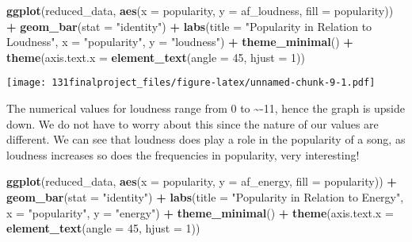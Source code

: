 \documentclass[
]{article}
\newenvironment{Shaded}{\begin{snugshade}}{\end{snugshade}}
\newcommand{\AttributeTok}[1]{\textcolor[rgb]{0.13,0.29,0.53}{#1}}
\newcommand{\DecValTok}[1]{\textcolor[rgb]{0.00,0.00,0.81}{#1}}
\newcommand{\FunctionTok}[1]{\textcolor[rgb]{0.13,0.29,0.53}{\textbf{#1}}}
\newcommand{\NormalTok}[1]{#1}
\newcommand{\SpecialCharTok}[1]{\textcolor[rgb]{0.81,0.36,0.00}{\textbf{#1}}}
\newcommand{\StringTok}[1]{\textcolor[rgb]{0.31,0.60,0.02}{#1}}
\begin{document}
\begin{Shaded}
\begin{Highlighting}[]
\FunctionTok{ggplot}\NormalTok{(reduced\_data, }\FunctionTok{aes}\NormalTok{(}\AttributeTok{x =}\NormalTok{ popularity, }\AttributeTok{y =}\NormalTok{ af\_loudness, }\AttributeTok{fill =}\NormalTok{ popularity)) }\SpecialCharTok{+}
  \FunctionTok{geom\_bar}\NormalTok{(}\AttributeTok{stat =} \StringTok{"identity"}\NormalTok{) }\SpecialCharTok{+}
  \FunctionTok{labs}\NormalTok{(}\AttributeTok{title =} \StringTok{"Popularity in Relation to Loudness"}\NormalTok{, }\AttributeTok{x =} \StringTok{"popularity"}\NormalTok{, }\AttributeTok{y =} \StringTok{"loudness"}\NormalTok{) }\SpecialCharTok{+}
  \FunctionTok{theme\_minimal}\NormalTok{() }\SpecialCharTok{+}
  \FunctionTok{theme}\NormalTok{(}\AttributeTok{axis.text.x =} \FunctionTok{element\_text}\NormalTok{(}\AttributeTok{angle =} \DecValTok{45}\NormalTok{, }\AttributeTok{hjust =} \DecValTok{1}\NormalTok{))}
\end{Highlighting}
\end{Shaded}

\texttt{[image: 131finalproject\_files/figure-latex/unnamed-chunk-9-1.pdf]}

The numerical values for loudness range from 0 to \textasciitilde-11,
hence the graph is upside down. We do not have to worry about this since
the nature of our values are different. We can see that loudness does
play a role in the popularity of a song, as loudness increases so does
the frequencies in popularity, very interesting!

\begin{Shaded}
\begin{Highlighting}[]
\FunctionTok{ggplot}\NormalTok{(reduced\_data, }\FunctionTok{aes}\NormalTok{(}\AttributeTok{x =}\NormalTok{ popularity, }\AttributeTok{y =}\NormalTok{ af\_energy, }\AttributeTok{fill =}\NormalTok{ popularity)) }\SpecialCharTok{+}
  \FunctionTok{geom\_bar}\NormalTok{(}\AttributeTok{stat =} \StringTok{"identity"}\NormalTok{) }\SpecialCharTok{+}
  \FunctionTok{labs}\NormalTok{(}\AttributeTok{title =} \StringTok{"Popularity in Relation to Energy"}\NormalTok{, }\AttributeTok{x =} \StringTok{"popularity"}\NormalTok{, }\AttributeTok{y =} \StringTok{"energy"}\NormalTok{) }\SpecialCharTok{+}
  \FunctionTok{theme\_minimal}\NormalTok{() }\SpecialCharTok{+}
  \FunctionTok{theme}\NormalTok{(}\AttributeTok{axis.text.x =} \FunctionTok{element\_text}\NormalTok{(}\AttributeTok{angle =} \DecValTok{45}\NormalTok{, }\AttributeTok{hjust =} \DecValTok{1}\NormalTok{))}
\end{Highlighting}
\end{Shaded}
\end{document}
